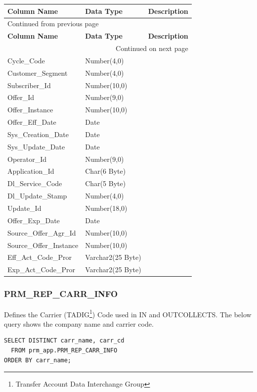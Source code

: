 \documentclass[12pt,twoside]{article}
\begin{document}
\begin{longtable}{l|l|l}
\hline
\textbf{Column Name} & \textbf{Data Type} & \textbf{Description}\\
\hline
\endfirsthead
\multicolumn{3}{l}{Continued from previous page} \\
\hline

\textbf{Column Name} & \textbf{Data Type} & \textbf{Description} \\

\hline
\endhead
\hline\multicolumn{3}{r}{Continued on next page} \\
\endfoot
\endlastfoot
\hline
Cycle\_Code & Number(4,0) & \\
Customer\_Segment & Number(4,0) & \\
Subscriber\_Id & Number(10,0) & \\
Offer\_Id & Number(9,0) & \\
Offer\_Instance & Number(10,0) & \\
Offer\_Eff\_Date & Date & \\
Sys\_Creation\_Date & Date & \\
Sys\_Update\_Date & Date & \\
Operator\_Id & Number(9,0) & \\
Application\_Id & Char(6 Byte) & \\
Dl\_Service\_Code & Char(5 Byte) & \\
Dl\_Update\_Stamp & Number(4,0) & \\
Update\_Id & Number(18,0) & \\
Offer\_Exp\_Date & Date & \\
Source\_Offer\_Agr\_Id & Number(10,0) & \\
Source\_Offer\_Instance & Number(10,0) & \\
Eff\_Act\_Code\_Pror & Varchar2(25 Byte) & \\
Exp\_Act\_Code\_Pror & Varchar2(25 Byte) & \\
\hline
\end{longtable}
\normalsize
\newpage
\subsubsection{PRM\_REP\_CARR\_INFO}
\label{sec:orgheadline43}
Defines the Carrier (TADIG\footnote{Transfer Account Data Interchange Group}) Code used in IN and OUTCOLLECTS.
The below query shows the company name and carrier code.

\begin{verbatim}
SELECT DISTINCT carr_name, carr_cd
  FROM prm_app.PRM_REP_CARR_INFO
ORDER BY carr_name;
\end{verbatim}
\end{document}

